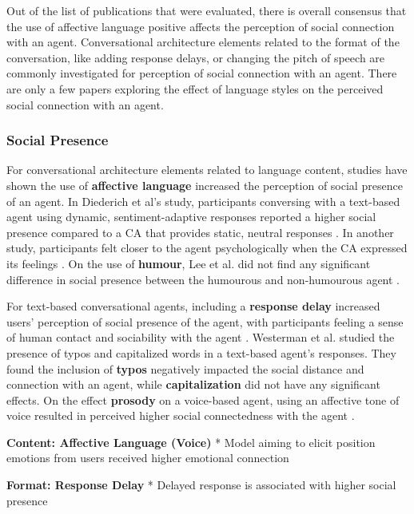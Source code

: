 \documentclass[sigconf,screen,review, anonymous]{acmart}
\newcommand{\cmt}[1]{}%
\begin{document}
Out of the list of publications that were evaluated, there is overall consensus that the use of affective language positive affects the perception of social connection with an agent. Conversational architecture elements related to the format of the conversation, like adding response delays, or changing the pitch of speech are commonly investigated for perception of social connection with an agent. There are only a few papers exploring the effect of language styles on the perceived social connection with an agent. 

\subsubsection{Social Presence}
For conversational architecture elements related to language content, studies have shown the use of \textbf{affective language} increased the perception of social presence of an agent. In Diederich et al's study, participants conversing with a text-based agent using dynamic, sentiment-adaptive responses reported a higher social presence compared to a CA that provides static, neutral responses \cite{diederich2019emulating}\cmt{[25]}. In another study, participants felt closer to the agent psychologically when the CA expressed its feelings \cite{lee2019s}\cmt{[55]}. On the use of \textbf{humour}, Lee et al. did not find any significant difference in social presence between the humourous and non-humourous agent \cite{lee2019s}\cmt{[55]}.

For text-based conversational agents, including a \textbf{response delay} increased users' perception of social presence of the agent, with participants feeling a sense of human contact and sociability with the agent \cite{kim2020can}\cmt{[24]}. Westerman et al. \cite{westerman2019believe}\cmt{[9]} studied the presence of typos and capitalized words in a text-based agent's responses. They found the inclusion of \textbf{typos} negatively impacted the social distance and connection with an agent, while \textbf{capitalization} did not have any significant effects. On the effect \textbf{prosody} on a voice-based agent, using an affective tone of voice resulted in perceived higher social connectedness with the agent \cite{kim2020can}\cmt{[24]}.

\textbf{Content: Affective Language (Voice)}
* Model aiming to elicit position emotions from users received higher emotional connection \cite{lubis2019positive}\cmt{[43]}

\textbf{Format: Response Delay}
* Delayed response is associated with higher social presence \cite{gnewuch2022opposing}\cmt{[20]}
\end{document}
